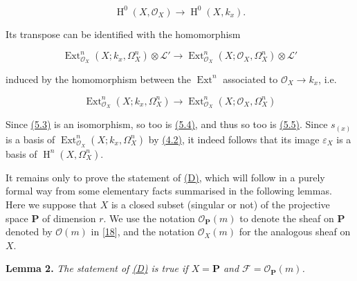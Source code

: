 \documentclass{article}
\newenvironment{itenv}[1]
  {\phantomsection\par\smallskip\noindent\textbf{#1.}\itshape}
  {\par\smallskip}
\newenvironment{eqenv}
  {}
  {}
\newcommand{\oldpage}[1]{\marginpar{\footnotesize$\Big\vert$ \textit{p.~#1}}}
\theoremstyle{definition}
\theoremstyle{definition}
\theoremstyle{definition}
\theoremstyle{definition}
\theoremstyle{remark}
\begin{document}
\leavevmode{}%
\begin{eqenv}
\[
  \operatorname{H}^0(X,{\mathscr{O}}_X) \to \operatorname{H}^0(X,k_x).
\tag{5.3}
\]

\end{eqenv}

Its transpose can be identified with the homomorphism

\leavevmode{}%
\begin{eqenv}
\[
  \operatorname{Ext}_{{\mathscr{O}}_X}^n(X;k_x,\Omega_X^n)\otimes{\mathscr{L}}' \to \operatorname{Ext}_{{\mathscr{O}}_X}^n(X;{\mathscr{O}}_X,\Omega_X^n)\otimes{\mathscr{L}}'
\tag{5.4}
\]

\end{eqenv}

induced by the homomorphism between the \(\operatorname{Ext}^n\) associated to \({\mathscr{O}}_X\to k_x\), i.e.

\leavevmode{}%
\begin{eqenv}
\[
  \operatorname{Ext}_{{\mathscr{O}}_X}^n(X;k_x,\Omega_X^n) \to \operatorname{Ext}_{{\mathscr{O}}_X}^n(X;{\mathscr{O}}_X,\Omega_X^n)
\tag{5.5}
\]

\end{eqenv}

\oldpage{149-15}Since \protect\hyperlink{fga-1-equation-5.3}{(5.3)} is an isomorphism, so too is \protect\hyperlink{fga-1-equation-5.4}{(5.4)}, and thus so too is \protect\hyperlink{fga-1-equation-5.5}{(5.5)}.
Since \(s_{(x)}\) is a basis of \(\operatorname{Ext}_{{\mathscr{O}}_X}^n(X;k_x,\Omega_X^n)\) by \protect\hyperlink{fga-1-equation-4.2}{(4.2)}, it indeed follows that its image \(\varepsilon_X\) is a basis of \(\operatorname{H}^n(X,\Omega_X^n)\).

It remains only to prove the statement of \protect\hyperlink{fga-1-D}{(D)}, which will follow in a purely formal way from some elementary facts summarised in the following lemmas.
Here we suppose that \(X\) is a closed subset (singular or not) of the projective space \(\mathbf{P}\) of dimension \(r\).
We use the notation \({\mathscr{O}}_\mathbf{P}(m)\) to denote the sheaf on \(\mathbf{P}\) denoted by \({\mathscr{O}}(m)\) in {[}\protect\hyperlink{ref-Ser1955}{18}{]}, and the notation \({\mathscr{O}}_X(m)\) for the analogous sheaf on \(X\).

\leavevmode{}%
\begin{itenv}{Lemma 2}
The statement of \protect\hyperlink{fga-1-D}{(D)} is true if \(X=\mathbf{P}\) and \({\mathscr{F}}={\mathscr{O}}_\mathbf{P}(m)\).

\end{itenv}
\end{document}
